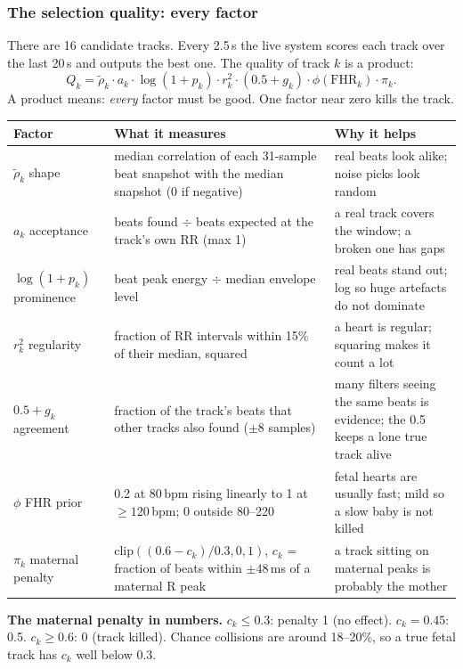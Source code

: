 \documentclass[11pt]{article}
\begin{document}
\subsubsection{The selection quality: every factor}
\label{sec:quality}
There are 16 candidate tracks. Every 2.5\,s the live system scores each track over the last 20\,s and outputs the best one. The quality of track $k$ is a product:
\[
Q_k = \tilde\rho_k \cdot a_k \cdot \log(1+p_k) \cdot r_k^2 \cdot (0.5 + g_k) \cdot \phi(\text{FHR}_k) \cdot \pi_k .
\]
A product means: \emph{every} factor must be good. One factor near zero kills the track.
\begin{center}
\small
\begin{tabularx}{\linewidth}{lXX}
\toprule
\textbf{Factor} & \textbf{What it measures} & \textbf{Why it helps} \\
\midrule
$\tilde\rho_k$ shape & median correlation of each 31-sample beat snapshot with the median snapshot (0 if negative) & real beats look alike; noise picks look random \\
$a_k$ acceptance & beats found $\div$ beats expected at the track's own RR (max 1) & a real track covers the window; a broken one has gaps \\
$\log(1+p_k)$ prominence & beat peak energy $\div$ median envelope level & real beats stand out; log so huge artefacts do not dominate \\
$r_k^2$ regularity & fraction of RR intervals within 15\% of their median, squared & a heart is regular; squaring makes it count a lot \\
$0.5 + g_k$ agreement & fraction of the track's beats that other tracks also found ($\pm 8$ samples) & many filters seeing the same beats is evidence; the 0.5 keeps a lone true track alive \\
$\phi$ FHR prior & 0.2 at 80\,bpm rising linearly to 1 at $\ge 120$\,bpm; 0 outside 80--220 & fetal hearts are usually fast; mild so a slow baby is not killed \\
$\pi_k$ maternal penalty & $\text{clip}((0.6 - c_k)/0.3, 0, 1)$, $c_k$ = fraction of beats within $\pm 48$\,ms of a maternal R peak & a track sitting on maternal peaks is probably the mother \\
\bottomrule
\end{tabularx}
\end{center}
\textbf{The maternal penalty in numbers.} $c_k \le 0.3$: penalty 1 (no effect). $c_k = 0.45$: 0.5. $c_k \ge 0.6$: 0 (track killed). Chance collisions are around 18--20\%, so a true fetal track has $c_k$ well below 0.3.
\end{document}
